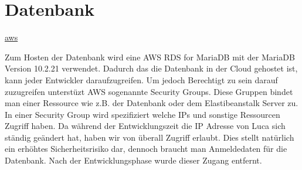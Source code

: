 \chapter{Datenbank}\label{ch:datenbank}
\href{https://aws.amazon.com/de/rds/mariadb/}{aws}

Zum Hosten der Datenbank wird eine AWS RDS for MariaDB mit der MariaDB Version 10.2.21 verwendet. Dadurch das die Datenbank in der Cloud gehostet ist, kann jeder Entwickler daraufzugreifen. Um jedoch Berechtigt zu sein darauf zuzugreifen unterstüzt AWS sogenannte Security Groups. Diese Gruppen bindet man einer Ressource wie z.B. der Datenbank oder dem Elastibeanstalk Server zu. In einer Security Group wird spezifiziert welche IPs und sonstige Ressourcen Zugriff haben. Da während der Entwicklungszeit die IP Adresse von Luca sich ständig geändert hat, haben wir von überall Zugriff erlaubt. Dies stellt natürlich ein erhöhtes Sicherheitsrisiko dar, dennoch braucht man Anmeldedaten für die Datenbank. Nach der Entwicklungsphase wurde dieser Zugang entfernt.